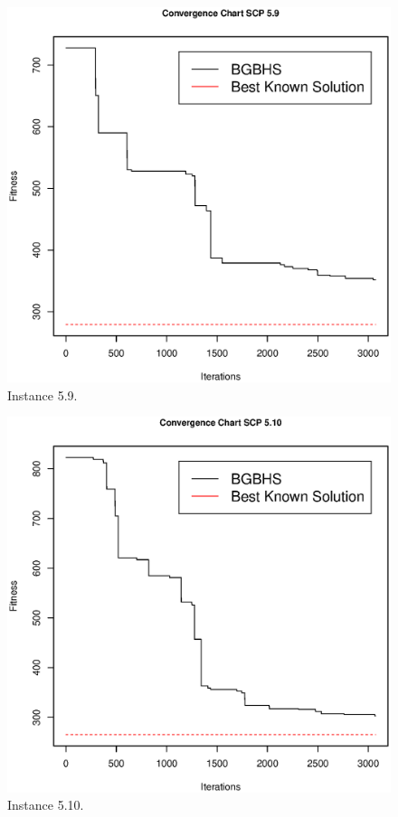 \begin{figure}[]
\centering
\includegraphics[scale=.45]{Resultados/scp59.eps}
\caption{Instance 5.9.}
\label{fig:Instance.5.9}
\end{figure}
\begin{figure}[]
\centering
\includegraphics[scale=.45]{Resultados/scp510.eps}
\caption{Instance 5.10.}
\label{fig:Instance.5.10}
\end{figure}

